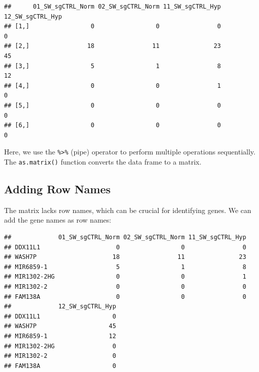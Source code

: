 \documentclass[
]{book}
\newenvironment{Shaded}{\begin{snugshade}}{\end{snugshade}}
\newcommand{\FunctionTok}[1]{\textcolor[rgb]{0.13,0.29,0.53}{\textbf{#1}}}
\newcommand{\NormalTok}[1]{#1}
\newcommand{\OtherTok}[1]{\textcolor[rgb]{0.56,0.35,0.01}{#1}}
\newcommand{\SpecialCharTok}[1]{\textcolor[rgb]{0.81,0.36,0.00}{\textbf{#1}}}
\begin{document}
\begin{verbatim}
##      01_SW_sgCTRL_Norm 02_SW_sgCTRL_Norm 11_SW_sgCTRL_Hyp 12_SW_sgCTRL_Hyp
## [1,]                 0                 0                0                0
## [2,]                18                11               23               45
## [3,]                 5                 1                8               12
## [4,]                 0                 0                1                0
## [5,]                 0                 0                0                0
## [6,]                 0                 0                0                0
\end{verbatim}

Here, we use the \texttt{\%\textgreater{}\%} (pipe) operator to perform multiple operations sequentially. The \texttt{as.matrix()} function converts the data frame to a matrix.

\hypertarget{adding-row-names}{%
\subsection{Adding Row Names}\label{adding-row-names}}

The matrix lacks row names, which can be crucial for identifying genes. We can add the gene names as row names:

\begin{Shaded}
\end{Shaded}

\begin{verbatim}
##             01_SW_sgCTRL_Norm 02_SW_sgCTRL_Norm 11_SW_sgCTRL_Hyp
## DDX11L1                     0                 0                0
## WASH7P                     18                11               23
## MIR6859-1                   5                 1                8
## MIR1302-2HG                 0                 0                1
## MIR1302-2                   0                 0                0
## FAM138A                     0                 0                0
##             12_SW_sgCTRL_Hyp
## DDX11L1                    0
## WASH7P                    45
## MIR6859-1                 12
## MIR1302-2HG                0
## MIR1302-2                  0
## FAM138A                    0
\end{verbatim}
\end{document}
